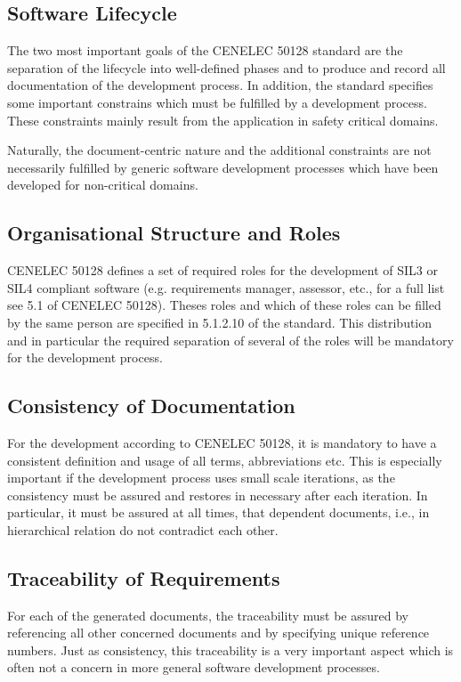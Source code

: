 
\subsection{Software Lifecycle}
\label{sec:software-lifecycle}

The two most important goals of the CENELEC 50128 standard are the separation of
the lifecycle into well-defined phases and to produce and record all
documentation of the development process. In addition, the standard specifies
some important constrains which must be fulfilled by a development
process. These constraints mainly result from the application in safety critical
domains.

Naturally, the document-centric nature and the additional constraints are not
necessarily fulfilled by generic software development processes which have been
developed for non-critical domains.

\subsection{Organisational Structure and Roles}
\label{sec:organ-struct-roles}

CENELEC 50128 defines a set of required roles for the development of SIL3 or
SIL4 compliant software (e.g. requirements manager, assessor, etc., for a full
list see 5.1 of CENELEC 50128). Theses roles and which of these roles can be
filled by the same person are specified in 5.1.2.10 of the standard. This
distribution and in particular the required separation of several of the roles
will be mandatory for the development process.


\subsection{Consistency of Documentation}
\label{sec:cons-docum}

For the development according to CENELEC 50128, it is mandatory to have a
consistent definition and usage of all terms, abbreviations etc. This is
especially important if the development process uses small scale iterations, as
the consistency must be assured and restores in necessary after each
iteration. In particular, it must be assured at all times, that dependent
documents, i.e., in hierarchical relation do not contradict each other.

\subsection{Traceability of Requirements}
\label{sec:trac-requ}

For each of the generated documents, the traceability must be assured by
referencing all other concerned documents and by specifying unique reference
numbers. Just as consistency, this traceability is a very important aspect which
is often not a concern in more general software development processes.





